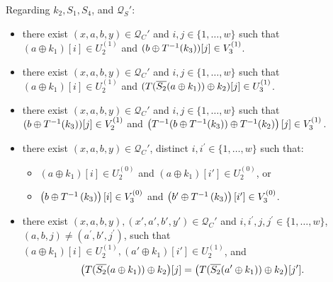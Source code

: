 \begin{definition}
Regarding $k_2,S_1,S_4$, and $\mathcal{Q}_S'$:
%
%
\begin{itemize}[leftmargin=10mm]
	\item[\bfive]
	there exist $(x,a,b,y) \in \mathcal{Q}_{C}'$ and $i, j \in\{1, \ldots, w\}$ such that $(a \oplus k_1)[i]\in U_{2}^{(1)}$ and $(b\oplus T^{-1}(k_3))[j]\in V_{3}^{(1)}$.
	\item[\bsix]
	there exist $(x,a,b,y) \in \mathcal{Q}_{C}'$ and $i, j \in\{1, \ldots, w\}$ such that $(a \oplus k_1)[i]\in U_{2}^{(1)}$ and $(T(\overline{S_2}(a \oplus k_1))\oplus k_2)[j]\in U_{3}^{(1)}$.
	\item[\bseven]
	there exist $(x,a,b,y) \in \mathcal{Q}_{C}'$ and $i, j \in\{1, \ldots, w\}$ such that $(b\oplus T^{-1}(k_3))[j]\in V_{2}^{(1)}$ and $\left(T^{-1}(b\oplus T^{-1}(k_3)) \oplus T^{-1}(k_2)\right)[j]\in V_{3}^{(1)}$.
	\item[\beight]
	there exist $(x,a,b,y) \in \mathcal{Q}_{C}'$, distinct $i, i^{\prime}\in\{1, \ldots, w\}$ such that:
	\begin{itemize}
		\item $(a \oplus k_1)[i]\in U_{2}^{(0)}$ and $(a \oplus k_1)[i']\in U_{2}^{(0)}$, or
		\item $\left(b\oplus T^{-1}\left(k_3\right)\right)[i]\in V_3^{(0)}$ and
		$\left(b'\oplus T^{-1}\left(k_3\right)\right)[i']\in V_3^{(0)}$.
	\end{itemize}
	\item[\bnine] there exist $(x,a,b,y),(x',a',b',y') \in \mathcal{Q}_{C}'$ and $i, i^{\prime},j, j^{\prime} \in\{1, \ldots, w\}$, $(a,b, j) \neq \left(a^{\prime}, b',j^{\prime}\right)$, such that $(a \oplus k_1)[i]\in U_{2}^{(1)}, (a' \oplus k_1)[i']\in U_{2}^{(1)}$, and
	$$\big(T(\overline{S_2}(a\oplus k_1))\oplus k_2\big)[j]=\big(T(\overline{S_2}(a'\oplus k_1))\oplus k_2\big)[j'].
	$$

\end{itemize}
\end{definition}
